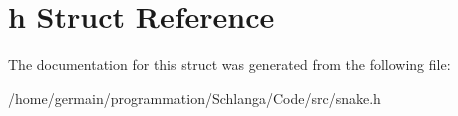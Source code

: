 \hypertarget{structsnake_1_1h}{\section{h Struct Reference}
\label{structsnake_1_1h}
}


The documentation for this struct was generated from the following file\-:\begin{DoxyCompactItemize}
\item 
/home/germain/programmation/\-Schlanga/\-Code/src/snake.\-h\end{DoxyCompactItemize}

